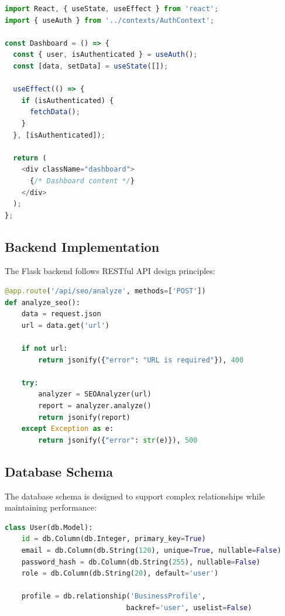 \documentclass[11pt,a4paper]{article}
\begin{document}
\begin{lstlisting}[language=JavaScript, caption=React Component Example]
import React, { useState, useEffect } from 'react';
import { useAuth } from '../contexts/AuthContext';

const Dashboard = () => {
  const { user, isAuthenticated } = useAuth();
  const [data, setData] = useState([]);
  
  useEffect(() => {
    if (isAuthenticated) {
      fetchData();
    }
  }, [isAuthenticated]);
  
  return (
    <div className="dashboard">
      {/* Dashboard content */}
    </div>
  );
};
\end{lstlisting}

\subsection{Backend Implementation}
The Flask backend follows RESTful API design principles:

\begin{lstlisting}[language=Python, caption=Flask API Endpoint Example]
@app.route('/api/seo/analyze', methods=['POST'])
def analyze_seo():
    data = request.json
    url = data.get('url')
    
    if not url:
        return jsonify({"error": "URL is required"}), 400
    
    try:
        analyzer = SEOAnalyzer(url)
        report = analyzer.analyze()
        return jsonify(report)
    except Exception as e:
        return jsonify({"error": str(e)}), 500
\end{lstlisting}

\subsection{Database Schema}
The database schema is designed to support complex relationships while maintaining performance:

\begin{lstlisting}[language=Python, caption=Database Model Example]
class User(db.Model):
    id = db.Column(db.Integer, primary_key=True)
    email = db.Column(db.String(120), unique=True, nullable=False)
    password_hash = db.Column(db.String(255), nullable=False)
    role = db.Column(db.String(20), default='user')
    
    profile = db.relationship('BusinessProfile', 
                             backref='user', uselist=False)
\end{lstlisting}
\end{document}
